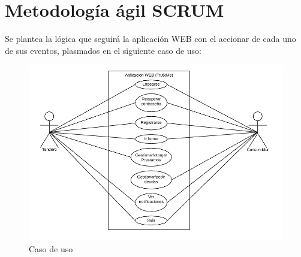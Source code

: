 \section{Metodología ágil SCRUM}

{Se plantea la lógica que seguirá la aplicación WEB con el accionar de cada uno de sus eventos, plasmados en el siguiente caso de uso:

\begin{figure}[H]
	\centering
	\includegraphics[width=1\linewidth]{development/casos.png}
	\caption{Caso de uso}
\end{figure}}
